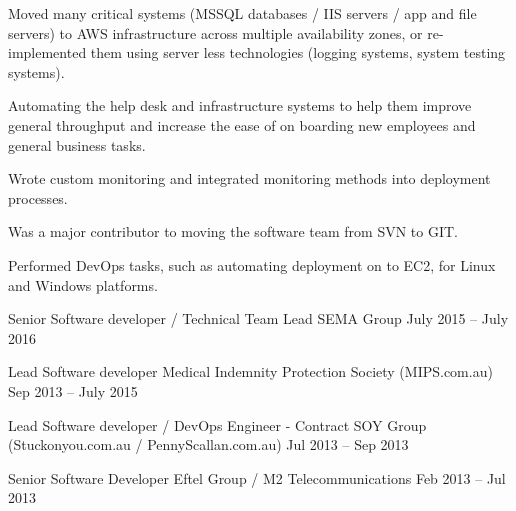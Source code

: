 \begin{cventries}
{\begin{cvitems}
{\begin{cvitems}
                    \item {Moved many critical systems (MSSQL databases / IIS servers / app and file servers)  to AWS
                                infrastructure across multiple availability zones, or re-implemented them using server less technologies (logging
                                systems, system testing systems).}
                    \item {Automating the help desk and infrastructure systems to help them improve general throughput and
                                increase the ease of on boarding new employees and general business tasks.}
                    \item {Wrote custom monitoring and integrated monitoring methods into deployment processes.}
                    \item {Was a major contributor to moving the software team from SVN to GIT.}
                    \item {Performed DevOps tasks, such as automating deployment on to EC2, for Linux and Windows platforms.\\
                          }
                  \end{cvitems}
            }
    \end{cvitems}
  }

  \cventry
  {Senior Software developer / Technical Team Lead } %
  {SEMA Group} %
  {} %
  {July 2015 – July 2016} %
  {}  %

  \cventry
  {Lead Software developer} %
  {Medical Indemnity Protection Society (MIPS.com.au)} %
  {} %
  {Sep 2013 – July 2015} %
  {}  %

  \cventry
  {Lead Software developer / DevOps Engineer - Contract} %
  {SOY Group (Stuckonyou.com.au / PennyScallan.com.au)} %
  {} %
  {Jul 2013 – Sep 2013} %
  {}  %

  \cventry
  {Senior Software Developer} %
  {Eftel Group / M2 Telecommunications} %
  {} %
  {Feb 2013 – Jul 2013} %
  {}  %


\end{cventries}
